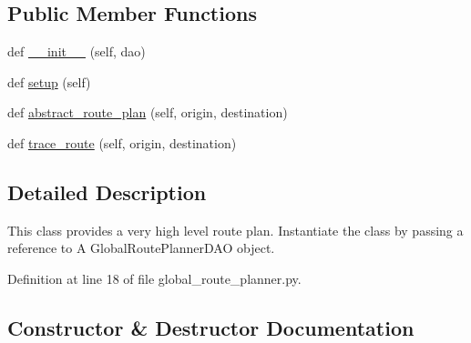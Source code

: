 \subsection*{Public Member Functions}
\begin{DoxyCompactItemize}
\item 
def \hyperlink{classscripts_1_1agents_1_1navigation_1_1global__route__planner_1_1GlobalRoutePlanner_a22be77eb07fc0532b5cb0c03e365cee0}{\+\_\+\+\_\+init\+\_\+\+\_\+} (self, dao)
\item 
def \hyperlink{classscripts_1_1agents_1_1navigation_1_1global__route__planner_1_1GlobalRoutePlanner_a1d5a29b9a1796bc9e1eaab60bc82f0f3}{setup} (self)
\item 
def \hyperlink{classscripts_1_1agents_1_1navigation_1_1global__route__planner_1_1GlobalRoutePlanner_a185c36e8f776da7fe7825e80a09267d9}{abstract\+\_\+route\+\_\+plan} (self, origin, destination)
\item 
def \hyperlink{classscripts_1_1agents_1_1navigation_1_1global__route__planner_1_1GlobalRoutePlanner_a0e1e3890e3adafbbb3acdb213c3077ff}{trace\+\_\+route} (self, origin, destination)
\end{DoxyCompactItemize}


\subsection{Detailed Description}
\begin{DoxyVerb}This class provides a very high level route plan.
Instantiate the class by passing a reference to
A GlobalRoutePlannerDAO object.
\end{DoxyVerb}
 

Definition at line 18 of file global\+\_\+route\+\_\+planner.\+py.



\subsection{Constructor \& Destructor Documentation}
\mbox{\label{classscripts_1_1agents_1_1navigation_1_1global__route__planner_1_1GlobalRoutePlanner_a22be77eb07fc0532b5cb0c03e365cee0}} 
